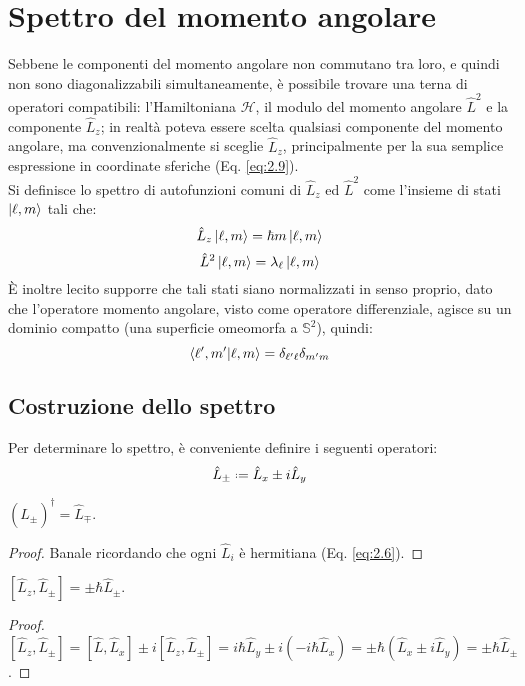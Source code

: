\section{Spettro del momento angolare}

Sebbene le componenti del momento angolare non commutano tra loro, e quindi non sono diagonalizzabili simultaneamente, è possibile trovare una terna di operatori compatibili: l'Hamiltoniana $ \mathcal{H} $, il modulo del momento angolare $ \hat{L}^2 $ e la componente $ \hat{L}_z $; in realtà poteva essere scelta qualsiasi componente del momento angolare, ma convenzionalmente si sceglie $ \hat{L}_z $, principalmente per la sua semplice espressione in coordinate sferiche (Eq. \ref{eq:2.9}).\\
Si definisce lo spettro di autofunzioni comuni di $ \hat{L}_z $ ed $ \hat{L}^2 $ come l'insieme di stati $ \ket{\ell,m} $ tali che:
\begin{equation}
	\hat{L}_z \ket{\ell,m} = \hbar m \ket{\ell,m}
	\label{eq:2.13}
\end{equation}
\begin{equation}
	\hat{L}^2 \ket{\ell,m} = \lambda_{\ell} \ket{\ell,m}
	\label{eq:2.14}
\end{equation}
È inoltre lecito supporre che tali stati siano normalizzati in senso proprio, dato che l'operatore momento angolare, visto come operatore differenziale, agisce su un dominio compatto (una superficie omeomorfa a $ \mathbb{S}^2 $), quindi:
\begin{equation}
	\braket{\ell',m' | \ell,m} = \delta_{\ell' \ell} \delta_{m' m}
	\label{eq:2.15}
\end{equation}

\subsection{Costruzione dello spettro}

Per determinare lo spettro, è conveniente definire i seguenti operatori:
\begin{equation}
	\hat{L}_{\pm} \defeq \hat{L}_x \pm i \hat{L}_y
	\label{eq:2.16}
\end{equation}

\begin{proposition}
	$ ( \hat{L}_{\pm} )^{\dagger} = \hat{L}_{\mp} $.
\end{proposition}
\begin{proof}
	Banale ricordando che ogni $ \hat{L}_i $ è hermitiana (Eq. \ref{eq:2.6}).
\end{proof}
\begin{proposition}
	$ [\hat{L}_z,\hat{L}_{\pm}] = \pm\hbar\hat{L}_{\pm} $.
\end{proposition}
\begin{proof}
	$ [\hat{L}_z,\hat{L}_{\pm}] = [\hat{L},\hat{L}_x] \pm i [\hat{L}_z,\hat{L}_{\pm}] = i\hbar \hat{L}_y \pm i (-i\hbar \hat{L}_x) = \pm \hbar (\hat{L}_x \pm i \hat{L}_y) = \pm\hbar\hat{L}_{\pm} $.
\end{proof}

